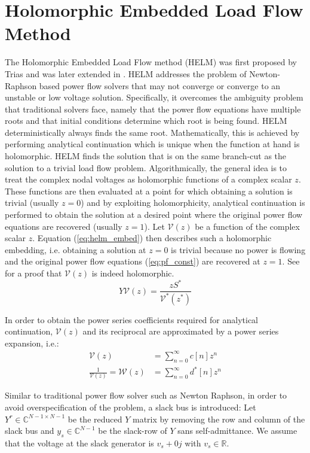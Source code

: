 \section{Holomorphic Embedded Load Flow Method}
\label{sec:helm}
The Holomorphic Embedded Load Flow method (HELM) was first proposed by Trias \cite{trias2012holomorphic,trias2015fundamentals} and was later extended in \cite{subramanian2013pv,wallace2016alternative}. HELM addresses the problem of Newton-Raphson based power flow solvers that may not converge or converge to an unstable or low voltage solution. Specifically, it overcomes the ambiguity problem that traditional solvers face, namely that the power flow equations have multiple roots and that initial conditions determine which root is being found. HELM deterministically always finds the same root. Mathematically, this is achieved by performing analytical continuation which is unique when the function at hand is holomorphic.  HELM finds the solution that is on the same branch-cut as the solution to a trivial load flow problem. Algorithmically, the general idea is to treat the complex nodal voltages as holomorphic functions of a complex scalar $z$. These functions are then evaluated at a point for which obtaining a solution is trivial (usually $z=0$) and by exploiting holomorphicity, analytical continuation is performed to obtain the solution at a desired point where the original power flow equations are recovered (usually $z = 1$). Let $\mathcal{V}(z)$ be a function of the complex scalar $z$. Equation (\ref{eq:helm_embed}) then describes such a holomorphic embedding, i.e. obtaining a solution at $z = 0$ is trivial because no power is flowing and the original power flow equations (\ref{eq:pf_const}) are recovered at $z = 1$. See \cite{wallace2016alternative} for a proof that $\mathcal{V}(z)$ is indeed holomorphic.
\begin{equation}
Y\mathcal{V}(z) = \frac{zS^*}{\mathcal{V}^*(z^*)} \label{eq:helm_embed}
\end{equation}

In order to obtain the power series coefficients required for analytical continuation, $\mathcal{V}(z)$ and its reciprocal are approximated by a power series expansion, i.e.:
\begin{align}
\mathcal{V}(z) &= \sum_{n=0}^\infty c[n]z^n \label{eq:power_series}\\
\frac{1}{\mathcal{V}(z)} = \mathcal{W}(z) &= \sum_{n=0}^\infty d^*[n]z^n
\end{align}

Similar to traditional power flow solver such as Newton Raphson, in order to avoid overspecification of the problem, a slack bus is introduced: Let $Y^r \in \mathbb{C}^{N-1 \times N-1}$ be the reduced $Y$ matrix by removing the row and column of the slack bus and $y_s \in \mathbb{C}^{N-1}$ be the slack-row of $Y$ sans self-admittance. We assume that the voltage at the slack generator is $v_s + 0j$ with $v_s \in \mathbb{R}$.\\

